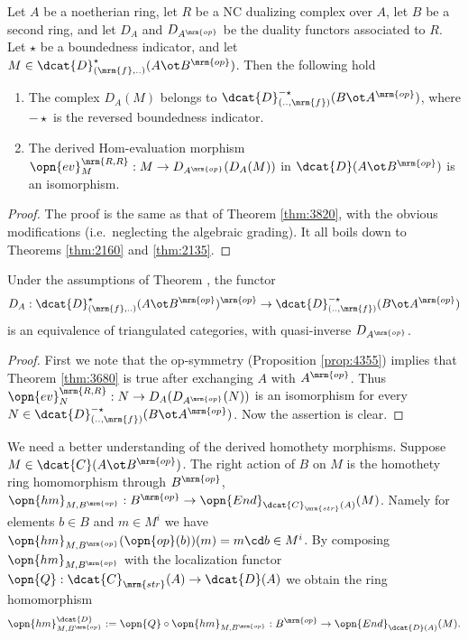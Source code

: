 \begin{thm} \label{thm:3680}
Let $A$ be a noetherian ring, let $R$ be a NC dualizing complex over $A$, let 
$B$ be a second ring, and let $D_A$ and $D_{A^{\mrm{op}}}$ be the  
duality functors associated to $R$. Let $\star$ be a boundedness indicator, and 
let $M \in \dcat{D}^{\star}_{(\mrm{f}, ..)}(A \ot B^{\mrm{op}})$.
Then the following hold\tup{:}
\begin{enumerate}
\item The complex $D_A(M)$ belongs to 
$\dcat{D}^{-\star}_{(.., \mrm{f})}(B \ot A^{\mrm{op}})$, where $-\star$ 
is the reversed boundedness indicator. 

\item The derived Hom-evaluation morphism 
$\opn{ev}^{\mrm{R, R}}_{M} : M \to D_{A^{\mrm{op}}}(D_{A}(M))$
in $\dcat{D}(A \ot B^{\mrm{op}})$ is an isomorphism. 
\end{enumerate}
\end{thm}

\begin{proof}
The proof is the same as that of Theorem \ref{thm:3820}, with the obvious 
modifications (i.e.\ neglecting the algebraic grading). 
It all boils down to Theorems \ref{thm:2160} and \ref{thm:2135}.
\end{proof}

\begin{cor} \label{cor:3680}
Under the assumptions of Theorem \tup{\ref{thm:3680}}, 
the functor
\[ D_{A} : \dcat{D}^{\star}_{(\mrm{f}, ..)}(A \ot B^{\mrm{op}})^{\mrm{op}} \to 
\dcat{D}^{-\star}_{(.., \mrm{f})}(B \ot A^{\mrm{op}}) \]
is an equivalence of triangulated categories, with quasi-inverse
$D_{A^{\mrm{op}}}$. 
\end{cor}

\begin{proof}
First we note that the op-symmetry (Proposition \ref{prop:4355}) implies that  
Theorem \ref{thm:3680} is true after exchanging $A$ with $A^{\mrm{op}}$. 
Thus 
$\opn{ev}^{\mrm{R, R}}_{N} : N \to D_{A}(D_{A^{\mrm{op}}}(N))$
is an isomorphism for every 
$N \in \dcat{D}^{-\star}_{(.., \mrm{f})}(B \ot A^{\mrm{op}})$. 
Now the assertion is clear. 
\end{proof}

We need a better understanding of the derived homothety morphisms. 
Suppose $M \in \dcat{C}(A \ot B^{\mrm{op}})$. The right action of $B$ on $M$ is 
the homothety ring homomorphism through $B^{\mrm{op}}$,
$\opn{hm}_{M, B^{\mrm{op}}} : B^{\mrm{op}} \to
\opn{End}_{\dcat{C}_{\mrm{str}}(A)}(M)$.
Namely for elements $b \in B$ and $m \in M^i$ we have 
$\opn{hm}_{M, B^{\mrm{op}}}(\opn{op}(b))(m) = m \cd b \in M^i$.
By composing $\opn{hm}_{M, B^{\mrm{op}}}$ with the localization functor 
$\opn{Q} : \dcat{C}_{\mrm{str}}(A) \to \dcat{D}(A)$
we obtain the ring homomorphism 
\begin{equation} \label{eqn:4357}
\opn{hm}_{M, B^{\mrm{op}}}^{\dcat{D}} := 
\opn{Q} \circ \opn{hm}_{M, B^{\mrm{op}}} : 
B^{\mrm{op}} \to \opn{End}_{\dcat{D}(A)}(M) .
\end{equation}

